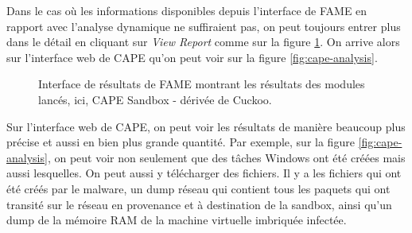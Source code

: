 Dans le cas où les informations disponibles depuis l'interface de FAME en rapport avec l'analyse dynamique ne suffiraient pas, on peut toujours entrer plus dans le détail en cliquant sur \textit{View Report} comme sur la figure \ref{fig:fame-cape-report}. On arrive alors sur l'interface web de CAPE qu'on peut voir sur la figure \ref{fig:cape-analysis}.

\begin{figure}
    \centering
    \caption{Interface de résultats de FAME montrant les résultats des modules lancés, ici, CAPE Sandbox - dérivée de Cuckoo.}
    \label{fig:fame-cape-report}
\end{figure}

Sur l'interface web de CAPE, on peut voir les résultats de manière beaucoup plus précise et aussi en bien plus grande quantité. Par exemple, sur la figure \ref{fig:cape-analysis}, on peut voir non seulement que des tâches Windows ont été créées mais aussi lesquelles. On peut aussi y télécharger des fichiers. Il y a les fichiers qui ont été créés par le malware, un dump réseau qui contient tous les paquets qui ont transité sur le réseau en provenance et à destination de la sandbox, ainsi qu'un dump de la mémoire RAM de la machine virtuelle imbriquée infectée.

